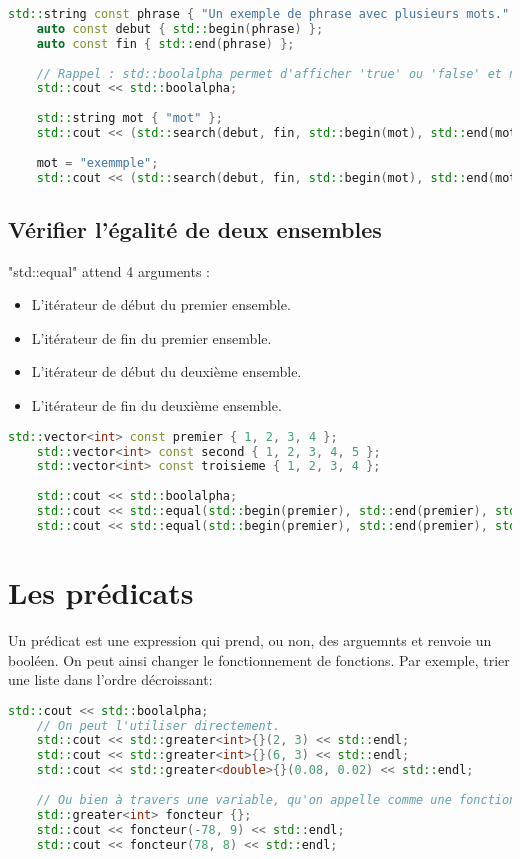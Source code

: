 \documentclass{article}
\begin{document}
\begin{lstlisting}[language=C++]
    std::string const phrase { "Un exemple de phrase avec plusieurs mots." };
    auto const debut { std::begin(phrase) };
    auto const fin { std::end(phrase) };
    
    // Rappel : std::boolalpha permet d'afficher 'true' ou 'false' et non '1' ou '0'.
    std::cout << std::boolalpha;
    
    std::string mot { "mot" };
    std::cout << (std::search(debut, fin, std::begin(mot), std::end(mot)) != fin) << std::endl;
    
    mot = "exemmple";
    std::cout << (std::search(debut, fin, std::begin(mot), std::end(mot)) != fin) << std::endl;
\end{lstlisting}{}

\subsection{Vérifier l'égalité de deux ensembles}
"std::equal" attend 4 arguments :
\begin{itemize}
    \item L’itérateur de début du premier ensemble.
    \item L’itérateur de fin du premier ensemble.
    \item L’itérateur de début du deuxième ensemble.
    \item L’itérateur de fin du deuxième ensemble.
\end{itemize}{}

\begin{lstlisting}[language=C++]
    std::vector<int> const premier { 1, 2, 3, 4 };
    std::vector<int> const second { 1, 2, 3, 4, 5 };
    std::vector<int> const troisieme { 1, 2, 3, 4 };
    
    std::cout << std::boolalpha;
    std::cout << std::equal(std::begin(premier), std::end(premier), std::begin(second), std::end(second)) << std::endl;
    std::cout << std::equal(std::begin(premier), std::end(premier), std::begin(troisieme), std::end(troisieme)) << std::endl;
\end{lstlisting}{}

\section{Les prédicats}
Un prédicat est une expression qui prend, ou non, des arguemnts et renvoie un booléen.
On peut ainsi changer le fonctionnement de fonctions.
Par exemple, trier une liste dans l'ordre décroissant:
\begin{lstlisting}[language=C++]
    std::cout << std::boolalpha;
    // On peut l'utiliser directement.
    std::cout << std::greater<int>{}(2, 3) << std::endl;
    std::cout << std::greater<int>{}(6, 3) << std::endl;
    std::cout << std::greater<double>{}(0.08, 0.02) << std::endl;
    
    // Ou bien à travers une variable, qu'on appelle comme une fonction.
    std::greater<int> foncteur {};
    std::cout << foncteur(-78, 9) << std::endl;
    std::cout << foncteur(78, 8) << std::endl;
\end{lstlisting}{}
\end{document}

